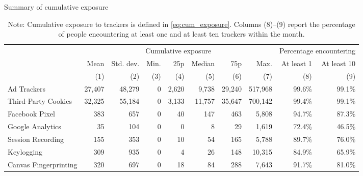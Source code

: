 \documentclass[12pt, letterpaper]{article}
\begin{document}
\begin{table}[ht]
\centering
\small
\setlength\tabcolsep{6 pt}
\setlength{\defaultaddspace}{0pt}
\def\sym#1{\ifmmode^{#1}\else\(^{#1}\)\fi}
\caption{Summary of cumulative exposure}
\label{tab:cumulative-exposure}
\begin{adjustbox}{max width=\textwidth}
\begin{tabular}{@{\hspace{0\tabcolsep}}lrrrrrrrrr@{\hspace{0\tabcolsep}}}
    \toprule\toprule
    &\multicolumn{7}{c}{Cumulative exposure}&\multicolumn{2}{c}{Percentage encountering}\\
    \cmidrule(lr){2-8}\cmidrule(l){9-10}
    & Mean & Std. dev. & Min. & 25p & Median & 75p & Max. & At least 1 & At least 10\\
    &\multicolumn{1}{r}{(1)}         &\multicolumn{1}{r}{(2)}         &\multicolumn{1}{r}{(3)}         &\multicolumn{1}{r}{(4)}         &\multicolumn{1}{r}{(5)}         &\multicolumn{1}{r}{(6)}         &\multicolumn{1}{r}{(7)}&\multicolumn{1}{r}{(8)}&\multicolumn{1}{r}{(9)}\\
    \midrule
    
Ad Trackers & 27,407 & 48,279 & 0 & 2,620 & 9,738 & 29,240 & 517,968 & 99.6\% & 99.1\% \\
Third-Party Cookies & 32,325 & 55,184 & 0 & 3,133 & 11,757 & 35,647 & 700,142 & 99.4\% & 99.1\% \\
Facebook Pixel & 383 & 657 & 0 & 40 & 147 & 463 & 5,808 & 94.7\% & 87.3\% \\
Google Analytics & 35 & 104 & 0 & 0 & 8 & 29 & 1,619 & 72.4\% & 46.5\% \\
Session Recording & 155 & 353 & 0 & 10 & 54 & 165 & 5,788 & 89.7\% & 76.0\% \\
Keylogging & 309 & 935 & 0 & 4 & 26 & 148 & 10,315 & 84.9\% & 65.9\% \\
Canvas Fingerprinting & 320 & 697 & 0 & 18 & 84 & 288 & 7,643 & 91.7\% & 81.0\% \\

   \bottomrule
\end{tabular}
\end{adjustbox}
\caption*{\footnotesize Note:
    Cumulative exposure to trackers is defined in \cref{eq:cum_exposure}.
    Columns (8)--(9) report the percentage of people encountering at least one and at least ten trackers within the month.
}
\end{table}
\end{document}

